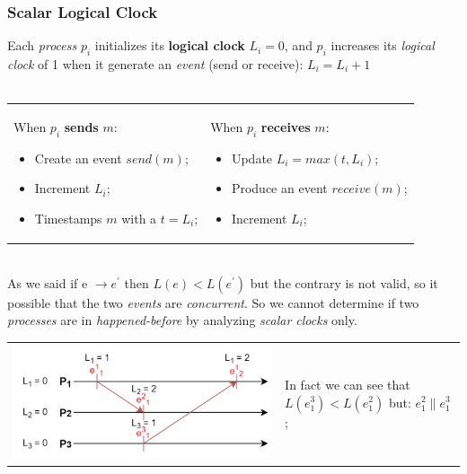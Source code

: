 \documentclass{article}
\begin{document}
\subsubsection{Scalar Logical Clock}
Each \emph{process} $p_i$ initializes its \textbf{logical clock} $L_i = 0$, and $p_i$ increases its \emph{logical clock} of 1 when it generate an \emph{event} (send or receive): $L_i = L_i +1$ \\\\
\begin{tabular}{C{8cm}  L{6cm}}
When $p_i$ \textbf{sends} $m$:
\begin{itemize}
\item Create an event $send(m)$;
\item Increment $L_i$;
\item Timestamps $m$ with a $t=L_i$;
\end{itemize}
&
When $p_i$ \textbf{receives} $m$:
\begin{itemize}
\item Update $L_i = max(t, L_i)$;
\item Produce an event $receive(m)$;
\item Increment $L_i$;
\end{itemize}
\end{tabular}\\
As we said if  e $\rightarrow e^{'}$ then $L(e) < L(e^{'})$ but the contrary is not valid, so it possible that the two \emph{events} are \emph{concurrent}. So we cannot determine if two \emph{processes} are in \emph{happened-before} by analyzing \emph{scalar clocks} only. \\
\begin{tabular}{C{7.5cm}  L{7cm}}
\includegraphics[scale=0.8, left]{cattura15.png}
& In fact we can see that $L(e^3_1)<L(e^2_1)$ but: $e^2_1 \parallel e^3_1$;
\end{tabular}
\end{document}
